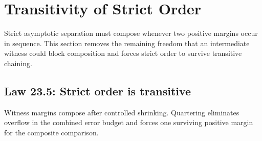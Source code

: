 \documentclass[11pt,a4paper]{book}
\begin{document}
\section{Transitivity of Strict Order}

Strict asymptotic separation must compose whenever two positive margins occur in sequence. This section removes the remaining freedom that an intermediate witness could block composition and forces strict order to survive transitive chaining.

\subsection*{Law 23.5: Strict order is transitive}

Witness margins compose after controlled shrinking. Quartering eliminates overflow in the combined error budget and forces one surviving positive margin for the composite comparison.
\end{document}
